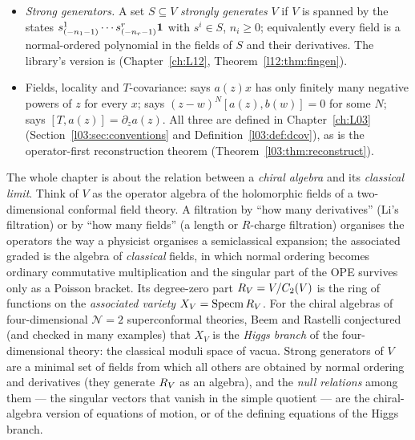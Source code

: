 \begin{itemize}
  $Y(a_{(-1)}b,z) = {:}Y(a,z)Y(b,z){:}$; the library's  is defined in Chapter~\ref{ch:L03}.
\item \emph{Strong generators.} A set $S\subseteq V$ \emph{strongly generates} $V$ if $V$ is spanned by the states
  $s^1_{(-n_1-1)}\cdots s^r_{(-n_r-1)}\mathbf{1}$ with $s^i\in S$, $n_i\ge0$; equivalently every field is a normal-ordered polynomial
  in the fields of $S$ and their derivatives. The library's version is  (Chapter~\ref{ch:L12},
  Theorem~\ref{l12:thm:fingen}).
\item Fields, locality and $T$-covariance:  says $a(z)x$ has only finitely many
  negative powers of $z$ for every $x$;  says $(z-w)^N[a(z),b(w)] = 0$ for some
  $N$;  says $[T,a(z)] = \partial_za(z)$. All three are defined in
  Chapter~\ref{ch:L03} (Section~\ref{l03:sec:conventions} and
  Definition~\ref{l03:def:dcov}), as is the operator-first reconstruction theorem
  \allowbreak{} (Theorem~\ref{l03:thm:reconstruct}).
\end{itemize}

\begin{physics}
The whole chapter is about the relation between a \emph{chiral algebra} and its \emph{classical
limit}. Think of $V$ as the operator algebra of the holomorphic fields of a two-dimensional
conformal field theory. A filtration by ``how many derivatives'' (Li's filtration) or by ``how many
fields'' (a length or $R$-charge filtration) organises the operators the way a physicist organises
a semiclassical expansion; the associated graded is the algebra of \emph{classical} fields, in which
normal ordering becomes ordinary commutative multiplication and the singular part of the OPE
survives only as a Poisson bracket. Its degree-zero part $R_V = V/C_2(V)$ is the ring of
functions on the \emph{associated variety} $X_V = \operatorname{Specm}R_V$. For the chiral
algebras of four-dimensional $\mathcal N=2$ superconformal theories, Beem and Rastelli conjectured
(and checked in many examples) that $X_V$ is the \emph{Higgs branch} of the four-dimensional theory:
the classical moduli space of vacua. Strong generators of $V$ are a minimal set of fields from which
all others are obtained by normal ordering and derivatives (they generate $R_V$ as an algebra),
and the \emph{null relations} among them --- the singular vectors that vanish in the simple quotient
--- are the chiral-algebra version of equations of motion, or of the defining equations of the Higgs
branch.
\end{physics}

